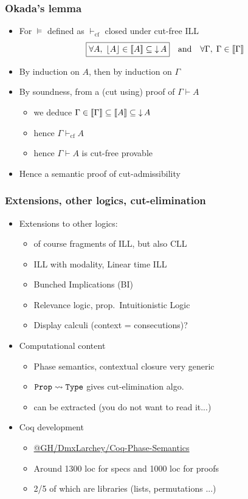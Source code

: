 \documentclass[xcolor=pdftex,graphicx=pdftex,12pt]{beamer}
\newcommand{\coq}[1]{\ensuremath{\mathalpha{\mathtt{#1}}}}
\newcommand{\sem}[1]{\llbracket{#1}\rrbracket}
\newcommand{\seq}{\mathrel\vdash}
\newcommand{\pable}{\mathrel{\models}}
\begin{document}
\begin{frame}

\frametitle{Okada's lemma}

\begin{itemize}
\item For ${\pable}$ defined as ${\seq_{\textrm{cf}}}$ closed under cut-free ILL
$$\fbox{$\forall A,\;\ulist A\in\sem A\subseteq\dc A$}\quad\text{and}\quad \forall\Gamma,\;\Gamma\in\sem\Gamma$$ 
\item By induction on $A$, then by induction on $\Gamma$
\item By soundness, from a (cut using) proof of $\Gamma\seq A$
  \begin{itemize}
  \item we deduce $\Gamma\in\sem\Gamma\subseteq\sem A\subseteq\dc A$
  \item hence $\Gamma \seq_{\textrm{cf}} A$
  \item hence $\Gamma\seq A$ is cut-free provable
  \end{itemize}
\item Hence a semantic proof of cut-admissibility
\end{itemize}

\end{frame}

\begin{frame}

\frametitle{Extensions, other logics, cut-elimination}

\begin{itemize}
\item Extensions to other logics:
  \begin{itemize}
  \item of course fragments of ILL, but also CLL
  \item ILL with modality, Linear time ILL
  \item Bunched Implications (BI)
  \item Relevance logic, prop.\ Intuitionistic Logic
  \item Display calculi (context = consecutions)?
  \end{itemize}
\item Computational content
  \begin{itemize}
  \item Phase semantics, contextual closure very generic
  \item $\coq{Prop} \rightsquigarrow \coq{Type}$ gives cut-elimination algo.
  \item can be extracted (you do not want to read it...)
  \end{itemize}
\item Coq development
  \begin{itemize}
  \item \url{@GH/DmxLarchey/Coq-Phase-Semantics}
  \item Around 1300 loc for specs and 1000 loc for proofs  
  \item 2/5 of which are libraries (lists, permutations ...)
  \end{itemize}
\end{itemize}

\end{frame}
\end{document}
